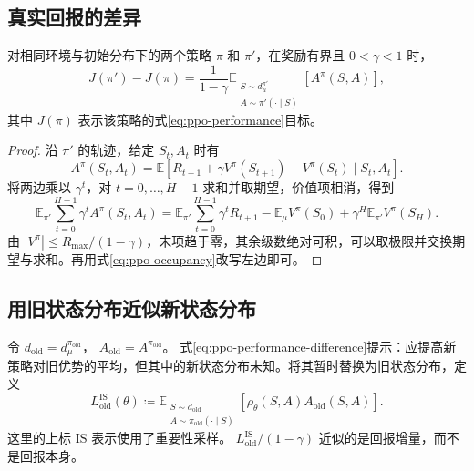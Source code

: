 \documentclass[UTF8,12pt,a4paper,fontset=fandol]{ctexart}
\begin{document}
\subsection{真实回报的差异}

\begin{proposition}[性能差异恒等式]
\label{prop:ppo-performance-difference}
对相同环境与初始分布下的两个策略 $\pi$ 和 $\pi'$，在奖励有界且 $0<\gamma<1$ 时，
\begin{equation}
  J(\pi')-J(\pi)
  =\frac1{1-\gamma}
    \mathbb E_{\substack{S\sim d^{\pi'}_\mu\\A\sim\pi'(\cdot\mid S)}}
      [A^\pi(S,A)],
  \label{eq:ppo-performance-difference}
\end{equation}
其中 $J(\pi)$ 表示该策略的式\eqref{eq:ppo-performance}目标。
\end{proposition}

\begin{proof}
沿 $\pi'$ 的轨迹，给定 $S_t,A_t$ 时有
\[
  A^\pi(S_t,A_t)
  =\mathbb E[R_{t+1}+\gamma V^\pi(S_{t+1})
             -V^\pi(S_t)\mid S_t,A_t].
\]
将两边乘以 $\gamma^t$，对 $t=0,\ldots,H-1$ 求和并取期望，价值项相消，得到
\[
  \mathbb E_{\pi'}\sum_{t=0}^{H-1}\gamma^tA^\pi(S_t,A_t)
  =\mathbb E_{\pi'}\sum_{t=0}^{H-1}\gamma^tR_{t+1}
    -\mathbb E_\mu V^\pi(S_0)
    +\gamma^H\mathbb E_{\pi'}V^\pi(S_H).
\]
由 $|V^\pi|\le R_{\max}/(1-\gamma)$，末项趋于零，其余级数绝对可积，可以取极限并交换期望与求和。再用式\eqref{eq:ppo-occupancy}改写左边即可。
\end{proof}

\subsection{用旧状态分布近似新状态分布}

令
$d_{\mathrm{old}}=d^{\pi_{\mathrm{old}}}_\mu$，
$A_{\mathrm{old}}=A^{\pi_{\mathrm{old}}}$。
式\eqref{eq:ppo-performance-difference}提示：应提高新策略对旧优势的平均，但其中的新状态分布未知。将其暂时替换为旧状态分布，定义
\begin{equation}
  L_{\mathrm{old}}^{\mathrm{IS}}(\theta)
  \coloneqq
  \mathbb E_{\substack{S\sim d_{\mathrm{old}}\\
                      A\sim\pi_{\mathrm{old}}(\cdot\mid S)}}
  [\rho_\theta(S,A)A_{\mathrm{old}}(S,A)].
  \label{eq:ppo-population-surrogate}
\end{equation}
这里的上标 $\mathrm{IS}$ 表示使用了重要性采样。
$L_{\mathrm{old}}^{\mathrm{IS}}/(1-\gamma)$ 近似的是回报增量，而不是回报本身。
\end{document}
